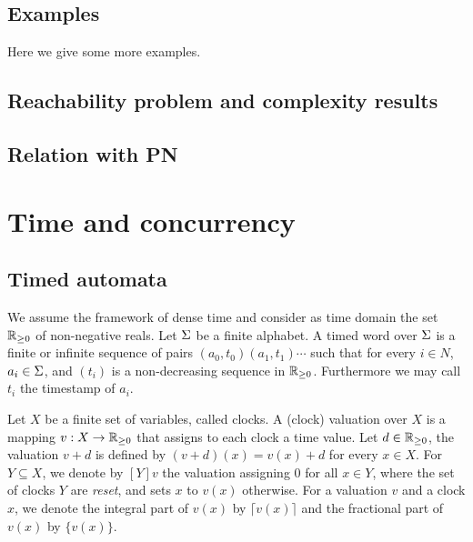 \subsection{Examples}

Here we give some more examples.




\subsection{Reachability problem and complexity results}


\subsection{Relation with PN}


\section{Time and concurrency}

\subsection{Timed automata}

We assume the framework of dense time and consider as time domain the set $\Rpos$ of non-negative reals. Let $\S$ be a finite alphabet. A timed word over $\S$ is a finite or infinite sequence of pairs $(a_0,t_0)(a_1,t_1)\cdots$ such that for every $i \in N$, $a_i \in \S$, and $(t_i)$ is a non-decreasing sequence in $\Rpos$. Furthermore we may call $t_i$ the timestamp of $a_i$. 

Let $X$ be a finite set of variables, called clocks. A (clock) valuation over $X$ is a mapping $v : X \rightarrow \Rpos$ that assigns to each clock a time value. Let $d \in \Rpos$, the valuation $v + d$ is defined by $(v + d)(x) = v(x) + d$ for every $x \in X$. For $Y \subseteq X$, we denote by $[Y]v$ the valuation assigning $0$ for all $x \in Y$, where the set of clocks $Y$ are \textit{reset}, and sets $x$ to $v(x)$ otherwise. For a valuation $v$ and a clock $x$, we denote the integral part of $v(x)$ by $\lceil v(x) \rceil$ and the fractional part of $v(x)$ by $\{v(x)\}$.

